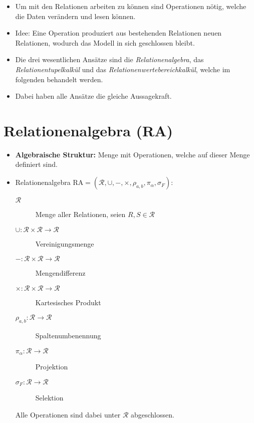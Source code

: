     \begin{itemize}
    	\item Um mit den Relationen arbeiten zu können sind Operationen nötig, welche die Daten verändern und lesen können.
    	\item Idee: Eine Operation produziert aus bestehenden Relationen neuen Relationen, wodurch das Modell in sich geschlossen bleibt.
    	\item Die drei wesentlichen Ansätze sind die \textit{Relationenalgebra}, das \textit{Relationentupelkalkül} und das \textit{Relationenwertebereichkalkül}, welche im folgenden behandelt werden.
    	\item Dabei haben alle Ansätze die gleiche Aussagekraft.
    \end{itemize}

    \section{Relationenalgebra (RA)} %
        \begin{itemize}
        	\item \textbf{Algebraische Struktur:} Menge mit Operationen, welche auf dieser Menge definiert sind.
        	\item Relationenalgebra \( \text{RA} = (\mathcal{R}, \cup, -, \times, \rho_{a,b}, \pi_\alpha, \sigma_F) \):
        		\begin{description}
        			\item[\( \mathcal{R} \)] Menge aller Relationen, seien \( R, S \in \mathcal{R} \)
        			\item[\( \cup : \mathcal{R} \times \mathcal{R} \rightarrow \mathcal{R} \)] Vereinigungsmenge
        			\item[\( - : \mathcal{R} \times \mathcal{R} \rightarrow \mathcal{R} \)] Mengendifferenz
        			\item[\( \times : \mathcal{R} \times \mathcal{R} \rightarrow \mathcal{R} \)] Kartesisches Produkt
        			\item[\( \rho_{a,b} : \mathcal{R} \rightarrow \mathcal{R} \)] Spaltenumbenennung
        			\item[\( \pi_\alpha : \mathcal{R} \rightarrow \mathcal{R} \)] Projektion
        			\item[\( \sigma_F : \mathcal{R} \rightarrow \mathcal{R} \)] Selektion
        		\end{description}
        		Alle Operationen sind dabei unter \( \mathcal{R} \) abgeschlossen.
        \end{itemize}


